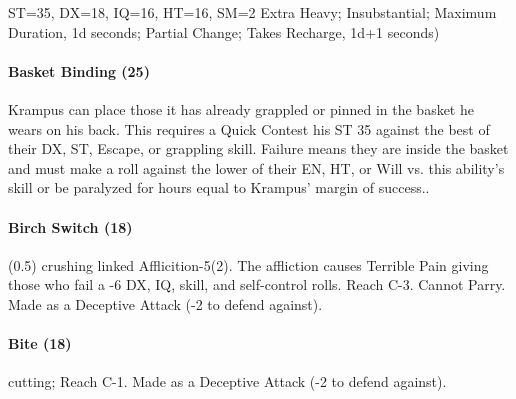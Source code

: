 \begin{character}{ST=35, DX=18, IQ=16, HT=16, SM=2}
{{  Extra Heavy; Insubstantial; Maximum Duration, 1d seconds; Partial Change;
  Takes Recharge, 1d+1 seconds)}}

\end{character}

\paragraph{Basket Binding (25)} Krampus can place those it has already grappled or pinned in the basket he wears on his back. This requires a Quick Contest his ST 35 against the best of their DX, ST, Escape, or grappling skill. Failure means they are inside the basket and must make a roll against the lower of their EN, HT, or Will vs. this ability’s skill or be paralyzed for hours equal to Krampus’ margin of success..

\paragraph{Birch Switch (18)} (0.5) crushing linked Afflicition-5(2). The affliction causes Terrible Pain giving those who fail a -6 DX, IQ, skill, and self-control rolls. Reach C-3. Cannot Parry.  Made as a Deceptive Attack (-2 to defend against).

\paragraph{Bite (18)}  cutting; Reach C-1. Made as a Deceptive Attack (-2 to defend against).

